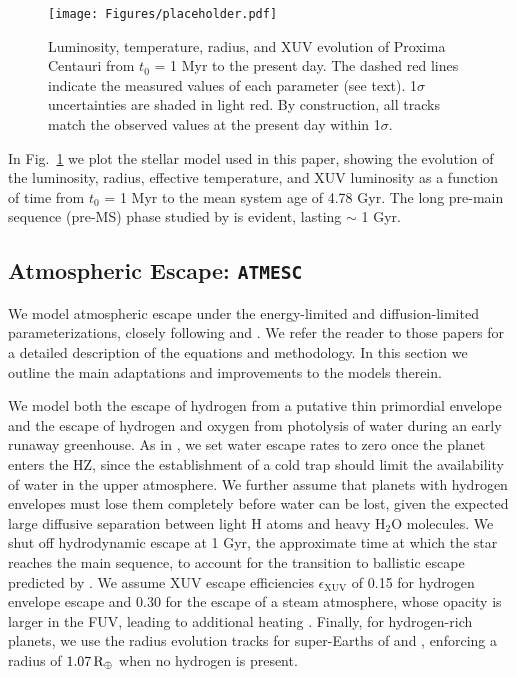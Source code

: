 \documentclass[preprint,12pt]{aastex}
\def\rearth{{\rm\,R_\oplus}}
\def\atmesc{\texttt{\footnotesize{ATMESC}}\xspace}
\begin{document}
\begin{figure}[ht]
\centering
\texttt{[image: Figures/placeholder.pdf]}
\caption{Luminosity, temperature, radius, and XUV evolution of Proxima
  Centauri from $t_0$ = 1 Myr to the present day. The dashed red lines
  indicate the measured values of each parameter (see text). 1$\sigma$
  uncertainties are shaded in light red. By construction, all tracks
  match the observed values at the present day within 1$\sigma$.}
\label{fig:stellar:evol}
\end{figure}

In Fig.~\ref{fig:stellar:evol} we plot the stellar model used in this
paper, showing the evolution of the luminosity, radius, effective
temperature, and XUV luminosity as a function of time from $t_0$ = 1
Myr to the mean system age of 4.78 Gyr. The long pre-main sequence
(pre-MS) phase studied by \cite{LugerBarnes15} is evident, lasting $\sim$ 
1 Gyr.

\subsection{Atmospheric Escape: \atmesc}
\label{sec:models:atmesc}

We model atmospheric escape under the energy-limited
\citep{Watson81,Erkaev07} and diffusion-limited \citep{Hunten73}
parameterizations, closely following \cite{Luger15} and
\cite{LugerBarnes15}. We refer the reader to those papers for a
detailed description of the equations and methodology. In this section
we outline the main adaptations and improvements to the models
therein.

We model both the escape of hydrogen from a putative thin primordial
envelope and the escape of hydrogen and oxygen from photolysis of
water during an early runaway greenhouse. As in \cite{LugerBarnes15},
we set water escape rates to zero once the planet enters the HZ, since
the establishment of a cold trap should limit the availability of
water in the upper atmosphere. We further assume that planets with
hydrogen envelopes must lose them completely before water can be lost,
given the expected large diffusive separation between light H atoms
and heavy H$_2$O molecules.  We shut off hydrodynamic escape at 1 Gyr,
the approximate time at which the star reaches the main sequence, to
account for the transition to ballistic escape predicted by
\cite{OwenMohanty16}. We assume XUV escape efficiencies
$\epsilon_\mathrm{XUV}$ of 0.15 for hydrogen envelope escape and 0.30
for the escape of a steam atmosphere, whose opacity is larger in the
FUV, leading to additional heating \citep{Sekiya81}. Finally, for
hydrogen-rich planets, we use the radius evolution tracks for
super-Earths of \cite{Lopez12} and \cite{LopezFortney14}, enforcing a
radius of $1.07 \rearth$ when no hydrogen is present.
\end{document}

